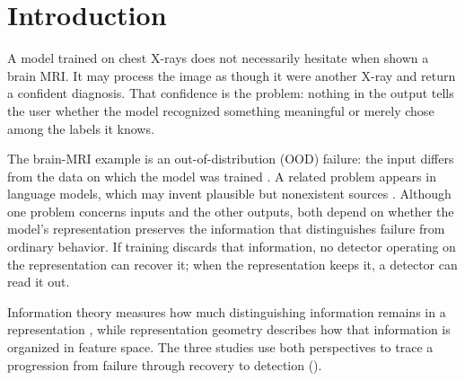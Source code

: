 \chapter{Introduction}
\label{ch:introduction}

A model trained on chest X-rays does not necessarily hesitate when shown a brain MRI. It may process the image as though it were another X-ray and return a confident diagnosis. That confidence is the problem: nothing in the output tells the user whether the model recognized something meaningful or merely chose among the labels it knows.

The brain-MRI example is an out-of-distribution (OOD) failure: the input differs
from the data on which the model was trained
\citep{hendrycks2016baseline,huang2020survey}. A related problem appears in
language models, which may invent plausible but nonexistent sources
\citep{li2023halueval,lin2021truthfulqa}. Although one problem concerns inputs and
the other outputs, both depend on whether the model's representation preserves
the information that distinguishes failure from ordinary behavior. If training
discards that information, no detector operating on the representation can
recover it; when the representation keeps it, a detector can read it out.

Information theory measures how much distinguishing information remains in a
representation \citep{shannon1948mathematical,cover1999elements}, while
representation geometry describes how that information is organized in feature
space. The three studies use both perspectives to trace a progression from
failure through recovery to detection ().

